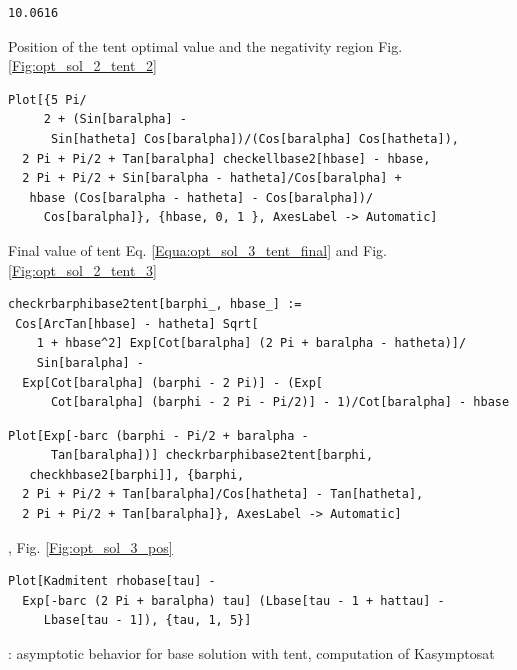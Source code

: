 \documentclass[reqno]{amsart}
\theoremstyle{definition} \newtheorem{definition}{Definition}[section]
\theoremstyle{definition} \newtheorem{remark}[definition]{Remark}
\theoremstyle{plain} \newtheorem{lemma}[definition]{Lemma}
\theoremstyle{plain} \newtheorem{proposition}[definition]{Proposition}
\theoremstyle{plain} \newtheorem{theorem}[definition]{Theorem}
\theoremstyle{plain} \newtheorem{corollary}[definition]{Corollary}
\theoremstyle{definition} \newtheorem{example}[definition]{Example}
\theoremstyle{plain} \newtheorem{claim}[clai]{Claim}
\theoremstyle{definition} \newtheorem{assumption}[definition]{Assumption}
\theoremstyle{definition} \newtheorem{observation}[definition]{Observation}
\newcommand{\1}{\mathbbm 1}
\newcommand{\smed}{\medskip}
\newcommand{\sbig}{\bigskip}
\numberwithin{equation}{section} %
\theoremstyle{plain} \newtheorem*{theorem*}{Theorem}
\theoremstyle{plain} \newtheorem{mthm}[maintheorem]{Main Theorem}
\theoremstyle{plain} \newtheorem*{mthm*}{Main Theorem}
\theoremstyle{plain} \newtheorem*{conjecture*}{Conjecture}
\theoremstyle{plain} \newtheorem{conjecture}[definition]{Conjecture}
\theoremstyle{plain} \newtheorem*{problem*}{Problem}
\begin{document}
\begin{verbatim}
10.0616
\end{verbatim}
\smed
Position of the tent optimal value and the negativity region Fig. \ref{Fig:opt_sol_2_tent_2}
\smed
\begin{verbatim}
Plot[{5 Pi/
     2 + (Sin[baralpha] - 
      Sin[hatheta] Cos[baralpha])/(Cos[baralpha] Cos[hatheta]), 
  2 Pi + Pi/2 + Tan[baralpha] checkellbase2[hbase] - hbase, 
  2 Pi + Pi/2 + Sin[baralpha - hatheta]/Cos[baralpha] + 
   hbase (Cos[baralpha - hatheta] - Cos[baralpha])/
     Cos[baralpha]}, {hbase, 0, 1 }, AxesLabel -> Automatic]
\end{verbatim}
\smed
Final value of tent Eq. \eqref{Equa:opt_sol_3_tent_final} and Fig. \ref{Fig:opt_sol_2_tent_3}
\smed
\begin{verbatim}
checkrbarphibase2tent[barphi_, hbase_] := 
 Cos[ArcTan[hbase] - hatheta] Sqrt[
    1 + hbase^2] Exp[Cot[baralpha] (2 Pi + baralpha - hatheta)]/
    Sin[baralpha] - 
  Exp[Cot[baralpha] (barphi - 2 Pi)] - (Exp[
      Cot[baralpha] (barphi - 2 Pi - Pi/2)] - 1)/Cot[baralpha] - hbase
\end{verbatim}
\begin{verbatim}
Plot[Exp[-barc (barphi - Pi/2 + baralpha - 
      Tan[baralpha])] checkrbarphibase2tent[barphi, 
   checkhbase2[barphi]], {barphi, 
  2 Pi + Pi/2 + Tan[baralpha]/Cos[hatheta] - Tan[hatheta], 
  2 Pi + Pi/2 + Tan[baralpha]}, AxesLabel -> Automatic]
\end{verbatim}

\sbig

, Fig. \ref{Fig:opt_sol_3_pos}

\sbig

\begin{verbatim}
Plot[Kadmitent rhobase[tau] - 
  Exp[-barc (2 Pi + baralpha) tau] (Lbase[tau - 1 + hattau] - 
     Lbase[tau - 1]), {tau, 1, 5}]
\end{verbatim}

\sbig

: asymptotic behavior for base solution with tent, computation of \gls{Kasymptosat}

\sbig
\end{document}
